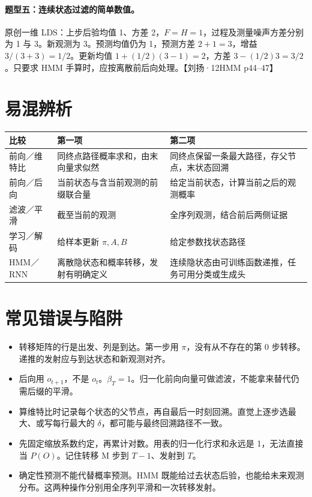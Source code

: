 \documentclass[UTF8,a4paper,zihao=-4,fontset=fandol]{ctexrep}
\begin{document}
\paragraph{题型五：连续状态过滤的简单数值。}
原创一维 LDS：上步后验均值 1、方差 2，$F=H=1$，过程及测量噪声方差分别为 1 与 3。新观测为 3。预测均值仍为 1，预测方差 $2+1=3$，增益 $3/(3+3)=1/2$。更新均值 $1+(1/2)(3-1)=2$，方差 $3-(1/2)3=3/2$。只要求 HMM 手算时，应按离散前后向处理。【刘扬·12HMM p44–47】

\section{易混辨析}
\begin{tabularx}{\linewidth}{@{}p{.25\linewidth}XX@{}}
\toprule
比较 & 第一项 & 第二项\\
\midrule
前向／维特比 & 同终点路径概率求和，由末向量求似然 & 同终点保留一条最大路径，存父节点，末状态回溯\\
前向／后向 & 当前状态与含当前观测的前缀联合量 & 给定当前状态，计算当前之后的观测概率\\
滤波／平滑 & 截至当前的观测 & 全序列观测，结合前后两侧证据\\
学习／解码 & 给样本更新 $\pi,A,B$ & 给定参数找状态路径\\
HMM／RNN & 离散隐状态和概率转移，发射有明确定义 & 连续隐状态由可训练函数递推，任务可用分类或生成头\\
\bottomrule
\end{tabularx}

\section{常见错误与陷阱}
\begin{itemize}
\item 转移矩阵的行是出发、列是到达。第一步用 $\pi$，没有从不存在的第 0 步转移。递推的发射应与到达状态和新观测对齐。
\item 后向用 $o_{t+1}$，不是 $o_t$。$\beta_T=1$。归一化前向向量可做滤波，不能拿来替代仍需后缀的平滑。
\item 算维特比时记录每个状态的父节点，再自最后一时刻回溯。直觉上逐步选最大、或写每行最大的 $\delta$，都可能与最终回溯路径不一致。
\item 先固定缩放系数约定，再累计对数。用表的归一化行求和永远是 1，无法直接当 $P(O)$。记住转移 M 步到 $T-1$、发射到 $T$。
\item 确定性预测不能代替概率预测。HMM 既能给过去状态后验，也能给未来观测分布。这两种操作分别用全序列平滑和一次转移发射。
\end{itemize}
\end{document}
